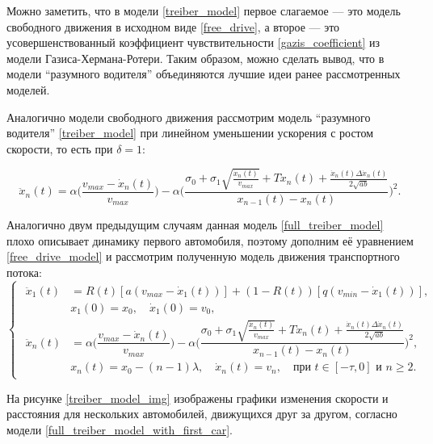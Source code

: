 \documentclass[12pt, a4paper]{extarticle}
\numberwithin{equation}{section}
\numberwithin{figure}{section}
\begin{document}
Можно заметить, что в модели \eqref{treiber_model} первое слагаемое --- это модель свободного движения в исходном виде \eqref{free_drive}, а второе --- это усовершенствованный коэффициент чувствительности \eqref{gazis_coefficient} из модели Газиса-Хермана-Ротери. Таким образом, можно сделать вывод, что в модели ``разумного водителя'' объединяются лучшие идеи ранее рассмотренных моделей.

Аналогично модели свободного движения рассмотрим модель ``разумного водителя'' \eqref{treiber_model} при линейном уменьшении ускорения с ростом скорости, то есть при $\delta=1$:

\begin{equation} \label{full_treiber_model}
\ddot{x}_n(t)= \alpha\bigg(\dfrac{v_{max}-\dot{x}_n(t)}{v_{max}} \bigg) - \alpha\bigg( \dfrac{\sigma_0+\sigma_1\sqrt{\frac{ \dot{x}_n(t)}{v_{max}}} +T \dot{x}_n(t)+ \frac{ \dot{x}_n(t)\Delta \dot{x}_n(t) }{2\sqrt{ab}}}{x_{n-1}(t)-x_n(t)}\bigg)^2.
\end{equation}

Аналогично двум предыдущим случаям данная модель \eqref{full_treiber_model} плохо описывает динамику первого автомобиля, поэтому дополним её уравнением \eqref{free_drive_model} и рассмотрим полученную модель движения транспортного потока:
\begin{equation} \label{full_treiber_model_with_first_car} 
\begin{cases}
\begin{split}
\ddot{x}_1(t)& = R(t) \left[ a\left(v_{max}-\dot{x}_1(t) \right)\right] + (1-R(t)) \left[ q\left( v_{min} - \dot{x}_1(t)\right) \right], \\
&x_{1}(0)=x_0, \quad \dot{x}_{1}(0)=v_{0},\\
\ddot{x}_n(t)& = \alpha\bigg(\dfrac{v_{max}-\dot{x}_n(t)}{v_{max}} \bigg) - \alpha\bigg( \dfrac{\sigma_0+\sigma_1\sqrt{\frac{ \dot{x}_n(t)}{v_{max}}} +T \dot{x}_n(t)+ \frac{ \dot{x}_n(t)\Delta \dot{x}_n(t) }{2\sqrt{ab}}}{x_{n-1}(t)-x_n(t)}\bigg)^2, \\
&x_n(t)=x_0-(n-1)\lambda, \quad \dot{x}_n(t)=v_{n}, \quad \text{при } t \in [-\tau,0] \text{ и } n\geq2.
\end{split}
\end{cases}
\end{equation}

На рисунке \ref{treiber_model_img} изображены графики изменения скорости и расстояния для нескольких автомобилей, движущихся друг за другом, согласно модели \eqref{full_treiber_model_with_first_car}.
\end{document}
